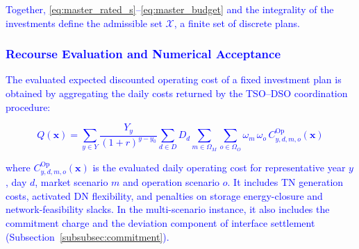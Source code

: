 \documentclass[preprint,12pt]{elsarticle}
\begin{document}
\textcolor{blue}{
    Together, \eqref{eq:master_rated_s}--\eqref{eq:master_budget} and the integrality of the investments define the admissible set $\mathcal{X}$, a finite set of discrete plans. 
}



\subsubsection{\textcolor{blue}{Recourse Evaluation and Numerical Acceptance}}
\label{subsubsec:certification}

\textcolor{blue}{
    The evaluated expected discounted operating cost of a fixed investment plan is obtained by aggregating the daily costs returned by the TSO--DSO coordination procedure:
}

\textcolor{blue}{
    \begin{equation}
        Q(\boldsymbol{x}) =
        \sum_{y \in Y} \frac{Y_y}{(1+r)^{y-y_0}}
        \sum_{d \in D} D_d
        \sum_{m \in \Omega_M} \sum_{o \in \Omega_O} \omega_m \, \omega_o \,
        C^{\text{Op}}_{y,d,m,o}(\boldsymbol{x})
        \label{eq:recourse_value}
    \end{equation}
}

\noindent
\textcolor{blue}{
    where 
    $C^{\text{Op}}_{y,d,m,o}(\boldsymbol{x})$ is the evaluated daily operating cost for representative year $y$, day $d$, market scenario $m$ and operation scenario $o$. It includes TN generation costs, activated DN flexibility, and penalties on storage energy-closure and network-feasibility slacks. In the multi-scenario instance, it also includes the commitment charge and the deviation component of interface settlement (Subsection~\ref{subsubsec:commitment}).
}
\end{document}
